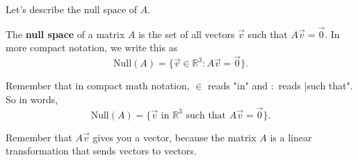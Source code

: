 \documentclass{ximera}
\begin{document}

Let's describe the null space of $A$.

\begin{definition}

    The {\bf null space} of a matrix $A$ is the set of all vectors $\vec{v}$ such that $A\vec{v} = \vec{0}$. In more compact notation, we write this as 
    $$\text{Null}(A) = \{ \vec{v} \in \mathbb{R}^3 : A\vec{v} = \vec{0} \}.$$

    \begin{hint}

        Remember that in compact math notation, $\in$ reads "in" and $:$ reads |such that". So in words, $$\text{Null}(A) = \{ \vec{v} \text{ in } \mathbb{R}^3 \text{ such that } A\vec{v} = \vec{0} \}.$$

        Remember that $A\vec{v}$ gives you a vector, because the matrix $A$ is a linear transformation that sends vectors to vectors.

    \end{hint}

\end{definition}
\end{document}
